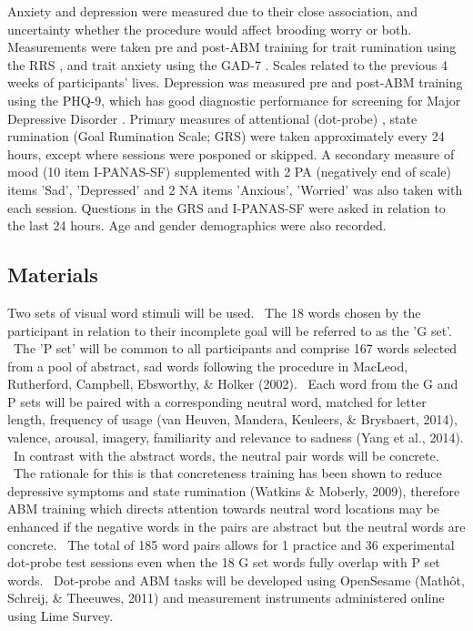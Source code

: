 \documentclass[man,floatsintext,a4paper,biblatex]{apa6}
\begin{document}
Anxiety and depression were measured due to their close association, and
uncertainty whether the procedure would affect brooding  worry or both. Measurements
were taken pre and post-ABM training for trait rumination using the RRS
\parencite{treynor_rumination_2003}, and trait anxiety using the GAD-7
\parencite{spitzer_rl_brief_2006}. Scales related to the previous 4
weeks of participants' lives.  Depression was measured pre and post-ABM
training using the PHQ-9, which has good diagnostic performance for
screening for Major Depressive Disorder \parencite{manea_diagnostic_2015}
. Primary measures
of attentional (dot-probe) \parencite{macleod_attentional_1986}, state
rumination (Goal Rumination Scale; GRS) \parencite{schultheiss_role_2008}
were taken approximately every 24 hours, except where sessions were
posponed or skipped.  A secondary measure of mood (10 item I-PANAS-SF)
\parencite{mackinnon_short_1999} supplemented with 2 PA (negatively end of
scale) items 'Sad', 'Depressed' and 2 NA items 'Anxious', 'Worried' was
also taken with each session.  Questions in the GRS and I-PANAS-SF were
asked in relation to the last 24 hours.  Age and gender demographics were also recorded.

\subsection{Materials}

Two sets of visual word stimuli will be used. \ The 18 words chosen by
the participant in relation to their incomplete goal will be referred
to as the 'G set'. \ The 'P set' will be common to all participants
and comprise 167 words selected from a pool of abstract, sad words
following the procedure in MacLeod, Rutherford, Campbell, Ebsworthy, \&
Holker (2002). \ Each word from the G and P sets will be paired with
a corresponding neutral word, matched for letter length, frequency of
usage (van Heuven, Mandera, Keuleers, \& Brysbaert, 2014), valence,
arousal, imagery, familiarity and relevance to sadness (Yang et al.,
2014). \ In contrast with the abstract words, the neutral pair words will
be concrete. \ The rationale for this is that concreteness training has
been shown to reduce depressive symptoms and state rumination (Watkins \&
Moberly, 2009), therefore ABM training which directs attention towards
neutral word locations may be enhanced if the negative words in the
pairs are abstract but the neutral words are concrete. \ The total of
185 word pairs allows for 1 practice and 36 experimental dot-probe test
sessions even when the 18 G set words fully overlap with P set words. \
Dot-probe and ABM tasks will be developed using OpenSesame (Math\^ot,
Schreij, \& Theeuwes, 2011) and measurement instruments administered
online using Lime Survey.
\end{document}
